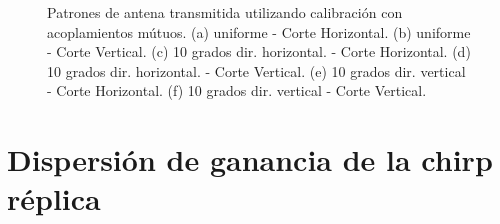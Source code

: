 \begin{figure}[H]
		\caption{Patrones de antena transmitida utilizando calibración con acoplamientos mútuos. (a) uniforme - Corte Horizontal.
			(b) uniforme - Corte Vertical. (c) 10 grados dir. horizontal. - Corte Horizontal. (d) 10 grados dir. horizontal. - Corte 
			Vertical. (e) 10 grados dir. vertical - Corte Horizontal. (f) 10 grados dir. vertical - Corte Vertical.}
	\label{fig:chirpErrorMutualPat}
\end{figure}

\section{Dispersión de ganancia de la chirp réplica}

